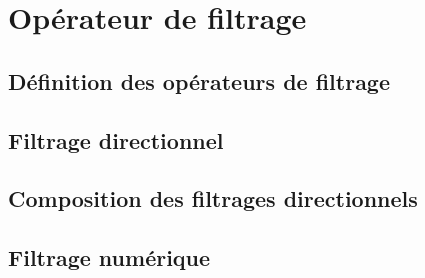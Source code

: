 \section{Opérateur de filtrage}

\subsection{Définition des opérateurs de filtrage}

\subsection{Filtrage directionnel}

\subsection{Composition des filtrages directionnels}

\subsection{Filtrage numérique}
